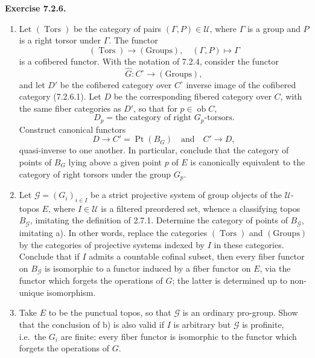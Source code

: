 \documentclass[11pt]{article}
\newcommand{\U}{\mathcal{U}}
\newcommand{\ob}{\operatorname{ob}}
\newcommand{\Ppoint}{\operatorname{Pt}}
\newcommand{\Ttors}{\operatorname{Tors}}
\newcommand{\ie}{i.e.}
\newcommand{\quav}{\quad\text{and}\quad}
\newenvironment{remarktext}[1]{\par\medskip\noindent\textbf{#1.}\ }{\par\medskip}
\begin{document}
\begin{remarktext}{Exercise 7.2.6}
\begin{enumerate}[label=\alph*)]
\item Let \((\Ttors)\) be the category of pairs \((\Gamma,P)\in\U\), where \(\Gamma\) is a group and \(P\) is a right torsor under \(\Gamma\). The functor
\begin{equation*}
(\Ttors)\longrightarrow(\text{Groups}),\quad (\Gamma,P)\longmapsto\Gamma\tag{7.2.6.1}
\end{equation*}
is a cofibered functor. With the notation of 7.2.4, consider the functor
\[
\widehat G:C^\circ\longrightarrow(\text{Groups}),
\]
and let \(D'\) be the cofibered category over \(C^\circ\) inverse image of the cofibered category (7.2.6.1). Let \(D\) be the corresponding fibered category over \(C\), with the same fiber categories as \(D'\), so that for \(p\in\ob C\),
\[
D_p=\text{the category of right }G_p\text{-torsors}.
\]
Construct canonical functors
\begin{equation*}
D\longrightarrow C'=\Ppoint(B_G)\quav C'\longrightarrow D,\tag{7.2.6.2}
\end{equation*}
quasi-inverse to one another. In particular, conclude that the category of points of \(B_G\) lying above a given point \(p\) of \(E\) is canonically equivalent to the category of right torsors under the group \(G_p\).

\item Let \(\mathcal G=(G_i)_{i\in I}\) be a strict projective system of group objects of the \(\U\)-topos \(E\), where \(I\in\U\) is a filtered preordered set, whence a classifying topos \(B_{\mathcal G}\), imitating the definition of 2.7.1. Determine the category of points of \(B_{\mathcal G}\), imitating a). In other words, replace the categories \((\Ttors)\) and \((\text{Groups})\) by the categories of projective systems indexed by \(I\) in these categories. Conclude that if \(I\) admits a countable cofinal subset, then every fiber functor on \(B_{\mathcal G}\) is isomorphic to a functor induced by a fiber functor on \(E\), via the functor which forgets the operations of \(G\); the latter is determined up to non-unique isomorphism.

\item Take \(E\) to be the punctual topos, so that \(\mathcal G\) is an ordinary pro-group. Show that the conclusion of b) is also valid if \(I\) is arbitrary but \(\mathcal G\) is profinite, \ie\ the \(G_i\) are finite: every fiber functor is isomorphic to the functor which forgets the operations of \(G\).


\end{enumerate}
\end{remarktext}
\end{document}
